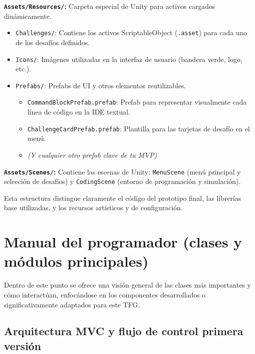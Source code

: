 \item \textbf{\texttt{Assets/Resources/}:} Carpeta especial de Unity para activos cargados dinámicamente.
\begin{itemize}
	\item \texttt{Challenges/}: Contiene los activos ScriptableObject (\texttt{.asset}) para cada uno de los desafíos definidos.
	\item \texttt{Icons/}: Imágenes utilizadas en la interfaz de usuario (bandera verde, logo, etc.).
	\item \texttt{Prefabs/}: Prefabs de UI y otros elementos reutilizables.
	\begin{itemize}
		\item \texttt{CommandBlockPrefab.prefab}: Prefab para representar visualmente cada línea de código en la IDE textual.
		\item \texttt{ChallengeCardPrefab.prefab}: Plantilla para las tarjetas de desafío en el menú.
		\item \textit{(Y cualquier otro prefab clave de tu MVP)}
	\end{itemize}
\end{itemize}

\item \textbf{\texttt{Assets/Scenes/}:} Contiene las escenas de Unity: \texttt{MenuScene} (menú principal y selección de desafíos) y \texttt{CodingScene} (entorno de programación y simulación).

Esta estructura distingue claramente el código del prototipo final, las librerías base utilizadas, y los recursos artísticos y de configuración.


\section{Manual del programador (clases y módulos principales)}
Dentro de este punto se ofrece una visión general de las clases más importantes y cómo interactúan, enfocándose en los componentes desarrollados o significativamente adaptados para este TFG.

\subsection{Arquitectura MVC y flujo de control primera versión}

